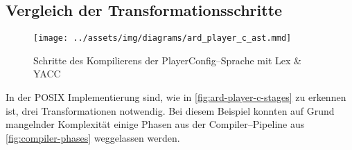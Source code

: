 \subsection{Vergleich der Transformationsschritte}\label{subsec:vergleich-der-transformationsschritte}
\begin{figure}[H]
    \begin{framed}
        
    \end{framed}
    \begin{framed}
        
    \end{framed}
    \begin{framed}
        \texttt{[image: ../assets/img/diagrams/ard\_player\_c\_ast.mmd]}
    \end{framed}
    \begin{framed}
        
    \end{framed}
    \caption{Schritte des Kompilierens der PlayerConfig--Sprache mit Lex \& \acs{YACC}}
    \label{fig:ard-player-c-stages}
\end{figure}
In der \ac{POSIX} Implementierung sind, wie in \autoref{fig:ard-player-c-stages} zu erkennen ist, drei Transformationen notwendig.
Bei diesem Beispiel konnten auf Grund mangelnder Komplexität einige Phasen aus der Compiler--Pipeline aus \autoref{fig:compiler-phases} weggelassen werden.

